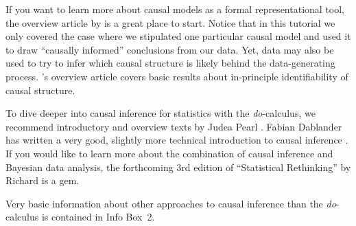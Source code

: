 \documentclass[nobib]{tufte-handout}
\newcommand{\docalc}{\emph{do}-calculus\xspace}
\begin{document}
If you want to learn more about causal models as a formal representational tool, the overview article by \citet{sep-causal-models} is a great place to start.
Notice that in this tutorial we only covered the case where we stipulated one particular causal model and used it to draw ``causally informed'' conclusions from our data.
Yet, data may also be used to try to infer which causal structure is likely behind the data-generating process.
\citeauthor{sep-causal-models}'s overview article covers basic results about in-principle identifiability of causal structure.

To dive deeper into causal inference for statistics with the \docalc, we recommend introductory and overview texts by Judea Pearl \citep{pearl2009causal,2016:Pearl-Judea-and}.
Fabian Dablander has written a very good, slightly more technical introduction to causal inference \citep{Dablander2020:An-Introduction}.
If you would like to learn more about the combination of causal inference and Bayesian data analysis, the forthcoming 3rd edition of ``Statistical Rethinking'' by Richard \citet{mcelreath2018statistical} is a gem.

Very basic information about other approaches to causal inference than the \docalc is contained in Info Box~2.
\end{document}
